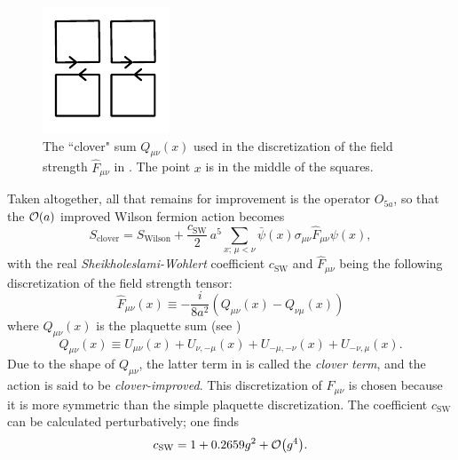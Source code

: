 \begin{figure}
  \centering
  \includegraphics[width=0.5\linewidth]{figs/clover.pdf}
  \caption{The ``clover" sum $Q_{\mu\nu}(x)$ used in the discretization of the
           field strength $\hat{F}_{\mu\nu}$ in .
           The point $x$ is in the middle of the squares.}
           
  \label{fig:clover}
\end{figure}

Taken altogether, all that remains for improvement is the operator $O_{5a}$,
so that the $\order{a}$ improved Wilson fermion action becomes
\begin{equation}\label{eq:cloverAction}
  S_\text{clover}=S_\text{Wilson}+\frac{c_\text{SW}}{2}
               \,a^5\sum_{x;\,\mu<\nu}\bar{\psi}(x)
                  \sigma_{\mu\nu}\hat{F}_{\mu\nu}\psi(x),
\end{equation}
with the real {\it Sheikholeslami-Wohlert} coefficient $c_\text{SW}$
\cite{sheikholeslami_improved_1985} and $\hat{F}_{\mu\nu}$ being the
following discretization of the field strength tensor:
\begin{equation}\label{eq:cloverField}
  \hat{F}_{\mu\nu}(x)\equiv
    -\frac{i}{8a^2}\left(Q_{\mu\nu}(x)-Q_{\nu\mu}(x)\right)
\end{equation}
where $Q_{\mu\nu}(x)$ is the plaquette sum (see )
\begin{equation}
  Q_{\mu\nu}(x)\equiv U_{\mu\nu}(x)+U_{\nu,-\mu}(x)
                 +U_{-\mu,-\nu}(x)+U_{-\nu,\mu}(x).
\end{equation}
Due to the shape of $Q_{\mu\nu}$, the latter term in 
 is called the {\it clover term}, and the
action is said to be {\it clover-improved}.
This discretization of $F_{\mu\nu}$ is chosen because it is more
symmetric than the simple plaquette discretization.
The coefficient $c_\text{SW}$ can be calculated perturbatively; one finds
\cite{sheikholeslami_improved_1985}
\begin{equation}\label{eq:SWcoeff}
  c_\text{SW}=1+0.2659 g^2+\order{g^4}.
\end{equation} 

